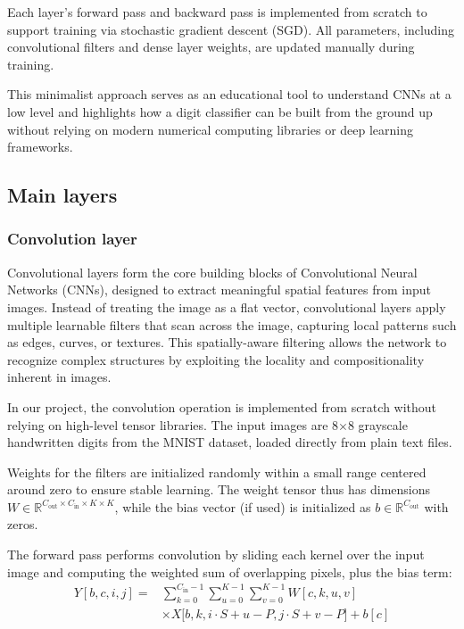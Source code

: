 \documentclass[conference]{IEEEtran}
\begin{document}
Each layer's forward pass and backward pass is implemented from scratch to support training via stochastic gradient descent (SGD). All parameters, including convolutional filters and dense layer weights, are updated manually during training.

This minimalist approach serves as an educational tool to understand CNNs at a low level and highlights how a digit classifier can be built from the ground up without relying on modern numerical computing libraries or deep learning frameworks.


\subsection{Main layers}
\subsubsection{Convolution layer}

Convolutional layers form the core building blocks of Convolutional Neural Networks (CNNs), designed to extract meaningful spatial features from input images. Instead of treating the image as a flat vector, convolutional layers apply multiple learnable filters that scan across the image, capturing local patterns such as edges, curves, or textures. This spatially-aware filtering allows the network to recognize complex structures by exploiting the locality and compositionality inherent in images.

In our project, the convolution operation is implemented from scratch without relying on high-level tensor libraries. The input images are 8$\times$8 grayscale handwritten digits from the MNIST dataset, loaded directly from plain text files.

Weights for the filters are initialized randomly within a small range centered around zero to ensure stable learning. The weight tensor thus has dimensions $W \in \mathbb{R}^{C_{\text{out}} \times C_{\text{in}} \times K \times K}$, while the bias vector (if used) is initialized as $b \in \mathbb{R}^{C_{\text{out}}}$ with zeros.

The forward pass performs convolution by sliding each kernel over the input image and computing the weighted sum of overlapping pixels, plus the bias term:
\[
\begin{aligned}
Y[b, c, i, j] = & \sum_{k=0}^{C_{\text{in}}-1} \sum_{u=0}^{K-1} \sum_{v=0}^{K-1} 
W[c, k, u, v] \\
& \times X\bigl[b, k, i \cdot S + u - P, j \cdot S + v - P\bigr] + b[c]
\end{aligned}
\]
\end{document}
